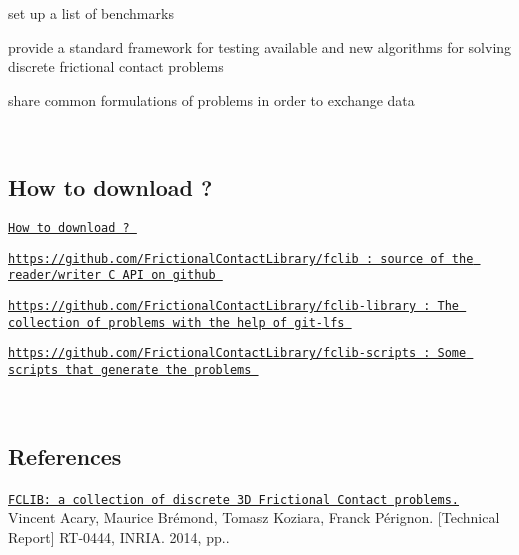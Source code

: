 \begin{DoxyItemize}
\item set up a list of benchmarks  
\item provide a standard framework for testing available and new algorithms for solving discrete frictional contact problems  
\item share common formulations of problems in order to exchange data 
\end{DoxyItemize}~\newline
\hypertarget{index_howtodownload}{}\subsection{How to download  ?}\label{index_howtodownload}
\href{https://github.com/FrictionalContactLibrary/}{\tt How to download ? } 
\begin{DoxyItemize}
\item \href{https://github.com/FrictionalContactLibrary/fclib}{\tt https\+://github.\+com/\+Frictional\+Contact\+Library/fclib \+: source of the reader/writer C A\+PI on github }  
\item \href{https://github.com/FrictionalContactLibrary/fclib-library}{\tt https\+://github.\+com/\+Frictional\+Contact\+Library/fclib-\/library \+: The collection of problems with the help of git-\/lfs }  
\item \href{https://github.com/FrictionalContactLibrary/fclib-scripts}{\tt https\+://github.\+com/\+Frictional\+Contact\+Library/fclib-\/scripts \+: Some scripts that generate the problems }  
\end{DoxyItemize}~\newline
 \hypertarget{index_References}{}\subsection{References}\label{index_References}
\href{https://hal.inria.fr/hal-00945820v2/document}{\tt F\+C\+L\+I\+B\+: a collection of discrete 3D Frictional Contact problems.} ~\newline
 Vincent Acary, Maurice Br\'{e}mond, Tomasz Koziara, Franck P\'{e}rignon. \mbox{[}Technical Report\mbox{]} R\+T-\/0444, I\+N\+R\+IA. 2014, pp..~\newline


